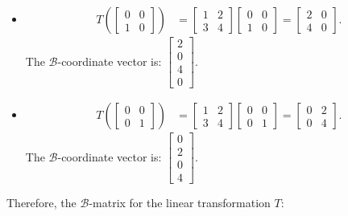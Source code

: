 \documentclass[10pt]{article}
\begin{document}
\begin{itemize}
    \item
    \begin{align*}
        T\left(\begin{bmatrix} 0 & 0 \\ 1 & 0 \end{bmatrix}\right)
        &= 
        \begin{bmatrix} 1 & 2 \\ 3 & 4 \end{bmatrix}
        \begin{bmatrix} 0 & 0 \\ 1 & 0 \end{bmatrix}
        = \begin{bmatrix} 2 & 0 \\ 4 & 0 \end{bmatrix}.
    \end{align*}
    \noindent The $\mathcal{B}$-coordinate vector is: $\begin{bmatrix} 2 \\ 0 \\ 4 \\ 0 \end{bmatrix}$.
    
    \item
    \begin{align*}
        T\left(\begin{bmatrix} 0 & 0 \\ 0 & 1 \end{bmatrix}\right)
        &= 
        \begin{bmatrix} 1 & 2 \\ 3 & 4 \end{bmatrix}
        \begin{bmatrix} 0 & 0 \\ 0 & 1 \end{bmatrix}
        = \begin{bmatrix} 0 & 2 \\ 0 & 4 \end{bmatrix}.
    \end{align*}
    \noindent The $\mathcal{B}$-coordinate vector is: $\begin{bmatrix} 0 \\ 2 \\ 0 \\ 4 \end{bmatrix}$.
\end{itemize}

\noindent Therefore, the $\mathcal{B}$-matrix for the linear transformation $T$:
\end{document}
